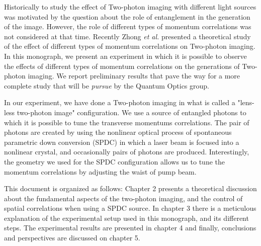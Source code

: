 Historically to study the effect of Two-photon imaging with different light sources was motivated by the question about the role of 
entanglement in the generation of the image. However, the role of different types of momentum correlations was not considered at that time. 
Recently Zhong \textit{et al.} presented a theoretical study of the effect of different types of momentum correlations on 
Two-photon imaging\cite{zhong}. In this monograph, we present an experiment in which it is possible to observe the effects of 
different types of momentum correlations on the generations of Two-photon imaging. We report preliminary results that pave the way for a more complete
study that will be \textit{pursue} by the Quantum Optics group.
 

In our experiment, we have done a Two-photon imaging in what is called a "lens-less two-photon image" configuration\cite{}. We use a source of entangled 
photons to which it is possible to tune the transverse momentums
 correlations. The pair of photons are created by using the nonlinear optical process of spontaneous parametric down conversion (SPDC) in which 
a laser beam is focused into a nonlinear crystal, and occasionally pairs of photons are produced.  Interestingly, the geometry we used for the SPDC configuration
allows us to tune the momentum correlations by adjusting the waist of pump beam\cite{omar}.






This document is organized as follows: Chapter 2 presents a theoretical discussion about the fundamental 
aspects of the two-photon imaging, and the control of spatial correlations when using a SPDC source.  
In chapter 3 there is a meticulous explanation of the experimental setup used in this monograph, and its different steps.
The experimental results are presented in chapter 4 and finally, conclusions and perspectives are discussed on chapter 5.

